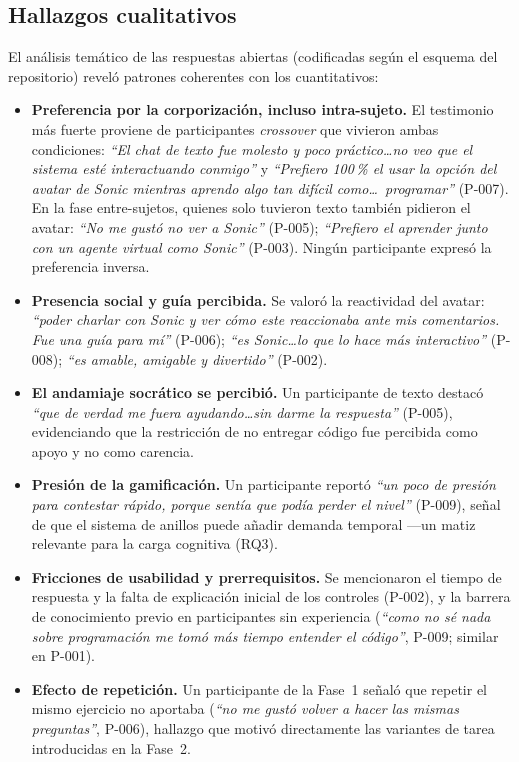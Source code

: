 \documentclass[conference]{IEEEtran}
\begin{document}
\subsection{Hallazgos cualitativos}
El an\'alisis tem\'atico de las respuestas abiertas (codificadas seg\'un el esquema del
repositorio) revel\'o patrones coherentes con los cuantitativos:
\begin{itemize}
  \item \textbf{Preferencia por la corporizaci\'on, incluso intra-sujeto.} El testimonio m\'as
        fuerte proviene de participantes \emph{crossover} que vivieron ambas condiciones:
        \emph{``El chat de texto fue molesto y poco pr\'actico\ldots no veo que el sistema est\'e
        interactuando conmigo''} y \emph{``Prefiero 100\,\% el usar la opci\'on del avatar de Sonic
        mientras aprendo algo tan dif\'icil como\ldots\ programar''} (P-007). En la fase
        entre-sujetos, quienes solo tuvieron texto tambi\'en pidieron el avatar:
        \emph{``No me gust\'o no ver a Sonic''} (P-005); \emph{``Prefiero el aprender junto con un
        agente virtual como Sonic''} (P-003). Ning\'un participante expres\'o la preferencia
        inversa.
  \item \textbf{Presencia social y gu\'ia percibida.} Se valor\'o la reactividad del avatar:
        \emph{``poder charlar con Sonic y ver c\'omo este reaccionaba ante mis comentarios. Fue una
        gu\'ia para m\'i''} (P-006); \emph{``es Sonic\ldots lo que lo hace m\'as interactivo''}
        (P-008); \emph{``es amable, amigable y divertido''} (P-002).
  \item \textbf{El andamiaje socr\'atico se percibi\'o.} Un participante de texto destac\'o
        \emph{``que de verdad me fuera ayudando\ldots sin darme la respuesta''} (P-005),
        evidenciando que la restricci\'on de no entregar c\'odigo fue percibida como apoyo y no
        como carencia.
  \item \textbf{Presi\'on de la gamificaci\'on.} Un participante report\'o
        \emph{``un poco de presi\'on para contestar r\'apido, porque sent\'ia que pod\'ia perder el
        nivel''} (P-009), se\~nal de que el sistema de anillos puede a\~nadir demanda temporal ---un
        matiz relevante para la carga cognitiva (RQ3).
  \item \textbf{Fricciones de usabilidad y prerrequisitos.} Se mencionaron el tiempo de respuesta y
        la falta de explicaci\'on inicial de los controles (P-002), y la barrera de conocimiento
        previo en participantes sin experiencia (\emph{``como no s\'e nada sobre programaci\'on me
        tom\'o m\'as tiempo entender el c\'odigo''}, P-009; similar en P-001).
  \item \textbf{Efecto de repetici\'on.} Un participante de la Fase~1 se\~nal\'o que repetir el
        mismo ejercicio no aportaba (\emph{``no me gust\'o volver a hacer las mismas preguntas''},
        P-006), hallazgo que motiv\'o directamente las variantes de tarea introducidas en la
        Fase~2.
\end{itemize}
\end{document}
